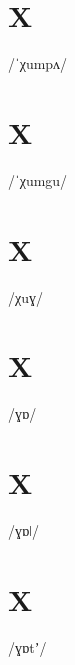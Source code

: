 \documentclass[10pt,a4paper,twoside]{book}
\begin{document}
\section*{X}

\begin{multicols}{3}
 {/ˈχumpʌ/} {}
\end{multicols}

\section*{X}

\begin{multicols}{3}
 {/ˈχumgu/} {}
\end{multicols}

\section*{X}

\begin{multicols}{3}
 {/χuɣ/} {}
\end{multicols}

\section*{X}

\begin{multicols}{3}
 {/ɣɒ/} {}
\end{multicols}

\section*{X}

\begin{multicols}{3}
 {/ɣɒǀ/} {}
\end{multicols}

\section*{X}

\begin{multicols}{3}
 {/ɣɒtʼ/} {}
\end{multicols}
\end{document}
